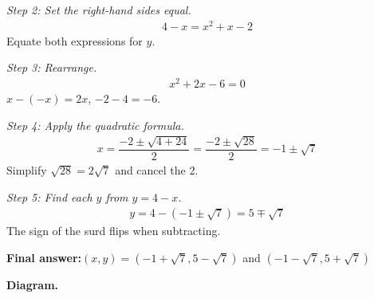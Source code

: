\documentclass[11pt]{article}
\begin{document}
\textit{Step 2: Set the right-hand sides equal.}
\[\begin{gathered}
4 - x = x^2 + x - 2
\end{gathered}\]
Equate both expressions for \( y \).

\textit{Step 3: Rearrange.}
\[\begin{gathered}
x^2 + 2x - 6 = 0
\end{gathered}\]
\( x - (-x) = 2x \), \( -2 - 4 = -6 \).

\textit{Step 4: Apply the quadratic formula.}
\[\begin{gathered}
x = \dfrac{-2 \pm \sqrt{4 + 24}}{2} = \dfrac{-2 \pm \sqrt{28}}{2} = -1 \pm \sqrt{7}
\end{gathered}\]
Simplify \( \sqrt{28} = 2\sqrt{7} \) and cancel the 2.

\textit{Step 5: Find each \( y \) from \( y = 4 - x \).}
\[\begin{gathered}
y = 4 - (-1 \pm \sqrt{7}) = 5 \mp \sqrt{7}
\end{gathered}\]
The sign of the surd flips when subtracting.

\begin{answerbox}
\textbf{Final answer:}\quad \(\displaystyle (x, y) = (-1 + \sqrt{7}, 5 - \sqrt{7})\) and \(\displaystyle (-1 - \sqrt{7}, 5 + \sqrt{7})\)
\end{answerbox}
\textbf{Diagram.}
\end{document}
